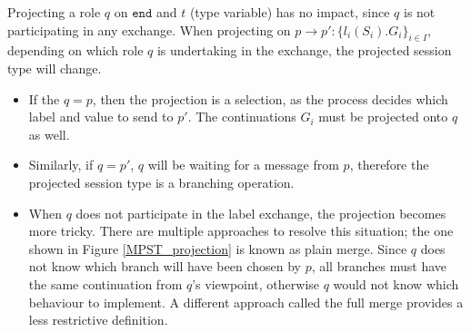 \documentclass[12pt,twoside]{report}
\begin{document}
Projecting a role $q$ on $\texttt{end}$ and $t$ (type variable) has no impact, since $q$ is not participating in any exchange. When projecting on $p \longrightarrow p':\{l_i(S_i).G_i\}_{i \in I}$, depending on which role $q$ is undertaking in the exchange, the projected session type will change. 
\begin{itemize}
    \item If the $q = p$, then the projection is a selection, as the process decides which label and value to send to $p'$. The continuations $G_i$ must be projected onto $q$ as well.
    \item Similarly, if $q = p'$, $q$ will be waiting for a message from $p$, therefore the projected session type is a branching operation. 
    \item  When $q$ does not participate in the label exchange, the projection becomes more tricky. There are multiple approaches to resolve this situation; the one shown in Figure \ref{MPST_projection} is known as plain merge. Since $q$ does not know which branch will have been chosen by $p$, all branches must have the same continuation from $q$'s viewpoint, otherwise $q$ would not know which behaviour to implement. A different approach called the full merge provides a less restrictive definition\cite{verygentleintrotompst}.
    
\end{itemize}
\end{document}
